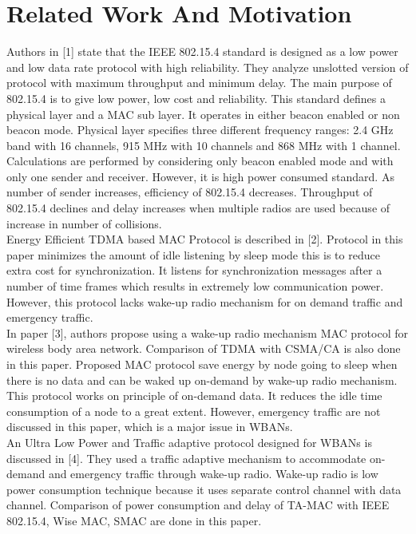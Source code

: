 \documentclass[10pt, conference, compsocconf]{IEEEtran}
\begin{document}
\section{Related Work And Motivation}
Authors in [1] state that the IEEE 802.15.4 standard is designed as a low power and low data rate protocol with high reliability. They analyze unslotted version of protocol with maximum throughput and minimum delay. The main purpose of 802.15.4 is to give low power, low cost and reliability. This standard defines a physical layer and a MAC sub layer. It operates in either beacon enabled or non beacon mode. Physical layer specifies three different frequency ranges: 2.4 GHz band with 16 channels, 915 MHz with 10 channels and 868 MHz with 1 channel. Calculations are performed by considering only beacon enabled mode and with only one sender and receiver. However, it is high power consumed standard. As number of sender increases, efficiency of 802.15.4 decreases. Throughput of 802.15.4 declines and delay increases when multiple radios are used because of increase in number of collisions.\\
\indent Energy Efficient TDMA based MAC Protocol is described in [2]. Protocol in this paper minimizes the amount of idle listening by sleep mode this is to reduce extra cost for synchronization. It listens for synchronization messages after a number of time frames which results in extremely low communication power. However, this protocol lacks wake-up radio mechanism for on demand traffic and emergency traffic.\\
\indent In paper [3], authors propose using a wake-up radio mechanism MAC protocol for wireless body area network. Comparison of TDMA with CSMA/CA is also done in this paper. Proposed MAC protocol save energy by node going to sleep when there is no data and can be waked up on-demand by wake-up radio mechanism. This protocol works on principle of on-demand data. It reduces the idle time consumption of a node to a great extent. However, emergency traffic are not discussed in this paper, which is a major issue in WBANs.\\
\indent An Ultra Low Power and Traffic adaptive protocol designed for WBANs is discussed in [4]. They used a traffic adaptive mechanism to accommodate on-demand and emergency traffic through wake-up radio. Wake-up radio is low power consumption technique because it uses separate control channel with data channel. Comparison of power consumption and delay of TA-MAC with IEEE 802.15.4, Wise MAC, SMAC are done in this paper.\\
\end{document}
